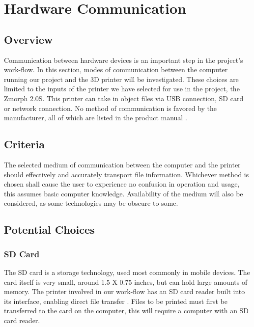 \documentclass[letterpaper, onecolumn, draftclsnofoot, 10pt, compsoc]{IEEEtran}
\begin{document}
\section{Hardware Communication}
        \subsection{Overview}
                \begin{singlespace}
                Communication between hardware devices is an important step in the project's work-flow.
                In this section, modes of communication between the computer running our project and the 3D printer will be investigated.
                These choices are limited to the inputs of the printer we have selected for use in the project, the Zmorph 2.0S.
                This printer can take in object files via USB connection, SD card or network connection.
                No method of communication is favored by the manufacturer, all of which are listed in the product manual \cite{printer}.
                \end{singlespace}
        \subsection{Criteria}
                \begin{singlespace}
                The selected medium of communication between the computer and the printer should effectively and accurately transport file information.
                Whichever method is chosen shall cause the user to experience no confusion in operation and usage, this assumes basic computer knowledge.
     			Availability of the medium will also be considered, as some technologies may be obscure to some. 
                \end{singlespace}
        \subsection{Potential Choices}
                \subsubsection{SD Card}
                        \begin{singlespace}
                        The SD card is a storage technology, used most commonly in mobile devices.
                        The card itself is very small, around 1.5 X 0.75 inches, but can hold large amounts of memory.
                        The printer involved in our work-flow has an SD card reader built into its interface, enabling direct file transfer \cite{SD}.
                        Files to be printed must first be transferred to the card on the computer, this will require a computer with an SD card reader.              
                        \end{singlespace}
\end{document}
